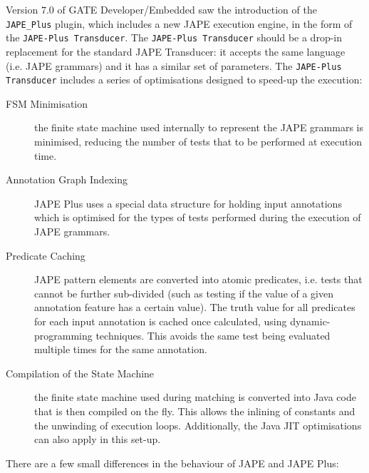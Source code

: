 Version $7.0$ of GATE Developer/Embedded saw the introduction of the 
\texttt{JAPE\_Plus} plugin, which includes a new JAPE execution engine, in the
form of the \texttt{JAPE-Plus Transducer}. The \texttt{JAPE-Plus Transducer}
should be a drop-in replacement for the standard JAPE Transducer: it accepts the
same language (i.e. JAPE grammars) and it has a similar set of parameters. The
\texttt{JAPE-Plus Transducer} includes a series of optimisations designed to
speed-up the execution:
\begin{description}
  \item [FSM Minimisation] the finite state machine used internally to represent
  the JAPE grammars is minimised, reducing the number of tests that to be
  performed at execution time.
  \item [Annotation Graph Indexing] JAPE Plus uses a special data structure for
  holding input annotations which is optimised for the types of tests performed
  during the execution of JAPE grammars.
  \item [Predicate Caching] JAPE pattern elements are converted into atomic
  predicates, i.e. tests that cannot be further sub-divided (such as testing if
  the value of a given annotation feature has a certain value). The truth value
  for all predicates for each input annotation is cached once calculated, using
  dynamic-programming techniques. This avoids the same test being evaluated
  multiple times for the same annotation.
  \item [Compilation of the State Machine] the finite state machine used during
  matching is converted into Java code that is then compiled on the fly. This
  allows the inlining of constants and the unwinding of execution loops.
  Additionally, the Java JIT optimisations can also apply in this set-up.
\end{description}

There are a few small differences in the behaviour of JAPE and JAPE Plus:

